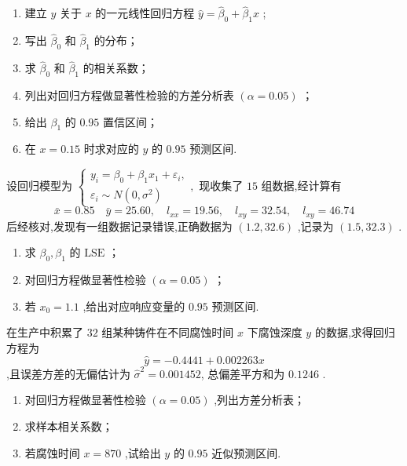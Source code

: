 \begin{xiti}
\begin{equation*}
    \end{equation*}
    \begin{enumerate}
        \item  建立 $y$ 关于 $x$ 的一元线性回归方程 $\hat{y}=\hat{\beta}_0+\hat{\beta}_1x$ ;
        \item 写出 $\hat{\beta}_0$ 和 $\hat{\beta}_1$ 的分布；
        \item 求 $\hat{\beta}_0$ 和 $\hat{\beta}_1$ 的相关系数；
        \item 列出对回归方程做显著性检验的方差分析表 $(\alpha=0.05)$ ；
        \item 给出 $\beta_1$ 的 $0.95$ 置信区间；
        \item 在 $x=0.15$ 时求对应的 $y$ 的 $0.95$ 预测区间.
    \end{enumerate}
    \item 设回归模型为 $\left\{\begin{array}{l}{y_{i}=\beta_{0}+\beta_{1} x_{1}+\varepsilon_{i}}, \\ {\varepsilon_{i} \sim N\left(0, \sigma^{2}\right)}\end{array},\right.$ 现收集了 $15$ 组数据,经计算有
    \begin{equation*}
    \bar{x}=0.85 \quad \bar{y}=25.60, \quad l_{x x}=19.56, \quad l_{x y}=32.54, \quad l_{x y}=46.74
    \end{equation*}
    后经核对,发现有一组数据记录错误,正确数据为 $(1.2,32.6)$ ,记录为 $(1.5,32.3)$ .
    \begin{enumerate}
        \item 求 $\beta_0,\beta_1$ 的 $\mathrm{LSE}$ ；
        \item 对回归方程做显著性检验 $(\alpha=0.05)$ ；
        \item 若 $x_0=1.1$ ,给出对应响应变量的 $0.95$ 预测区间.
    \end{enumerate}
    \item 在生产中积累了 $32$ 组某种铸件在不同腐蚀时间 $x$ 下腐蚀深度 $y$ 的数据,求得回归方程为
    \begin{equation*}
    \hat{y}=-0.4441+0.002263x
    \end{equation*}
    ,且误差方差的无偏估计为 $\hat{\sigma}^2=0.001452$, 总偏差平方和为 $0.1246$ .
    \begin{enumerate}
        \item 对回归方程做显著性检验 $(\alpha=0.05)$ ,列出方差分析表；
        \item 求样本相关系数；
        \item 若腐蚀时间 $x=870$ ,试给出 $y$ 的 $0.95$ 近似预测区间.

\end{enumerate}
\end{xiti}
